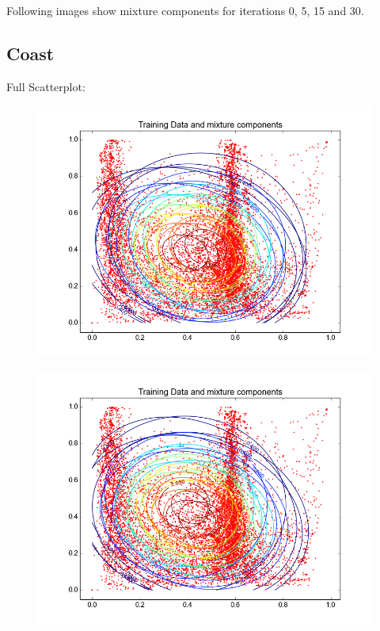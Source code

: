 \documentclass[11pt,a4paper]{article}
\begin{document}
Following images show mixture components for iterations 0, 5, 15 and 30.
\subsection{Coast}
Full Scatterplot: \\
\begin{minipage}[b]{0.25\textwidth}
\begin{figure}[H]
  \centering
  \includegraphics[width=.8\linewidth]{Figures/contourscoast0.png}
  \label{fig:sfig1}
\end{figure}%
\end{minipage}
\begin{minipage}[b]{0.25\textwidth}
\begin{figure}[H]
  \centering
  \includegraphics[width=.8\linewidth]{Figures/contourscoast5.png}

  \label{fig:sfig1}
\end{figure}%
\end{minipage}
\end{document}

